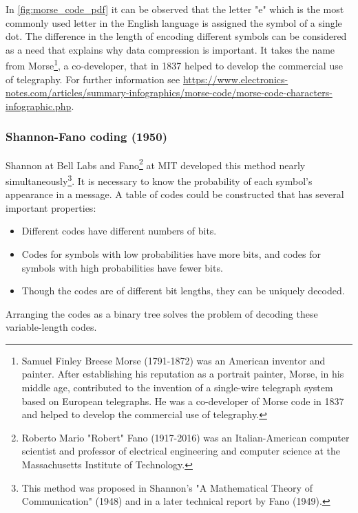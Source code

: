 \documentclass[12pt, a4paper]{report}
\begin{document}
In \autoref{fig:morse_code_pdf} it can be observed that the letter "e" which is the most commonly used letter in the English
language is assigned the symbol of a single dot.
The difference in the length of encoding different symbols can be considered as a need that explains why data compression is
important.
It takes the name from Morse\footnote{Samuel Finley Breese Morse (1791-1872) was an American inventor and painter. After
establishing his reputation as a portrait painter, Morse, in his middle age, contributed to the invention of a single-wire
telegraph system based on European telegraphs. He was a co-developer of Morse code in 1837 and helped to develop the commercial
use of telegraphy.}, a co-developer, that in 1837 helped to develop the commercial use of telegraphy.
For further information see
\href{https://www.electronics-notes.com/articles/summary-infographics/morse-code/morse-code-characters-infographic.php}
{https://www.electronics-notes.com/articles/summary-infographics/morse-code/morse-code-characters-infographic.php}.

\subsubsection{Shannon-Fano coding (1950)}

Shannon at Bell Labs and Fano\footnote{Roberto Mario "Robert" Fano (1917-2016) was an Italian-American computer scientist and
professor of electrical engineering and computer science at the Massachusetts Institute of Technology.} at MIT developed this
method nearly simultaneously\footnote{This method was proposed in Shannon's "A Mathematical Theory of Communication" (1948) and
in a later technical report by Fano (1949).}.
It is necessary to know the probability of each symbol's appearance in a message.
A table of codes could be constructed that has several important properties:

\begin{itemize}
  \item Different codes have different numbers of bits.
  \item Codes for symbols with low probabilities have more bits, and codes for symbols with high probabilities have fewer bits.
  \item Though the codes are of different bit lengths, they can be uniquely decoded.
\end{itemize}

Arranging the codes as a binary tree solves the problem of decoding these variable-length codes.
\end{document}
